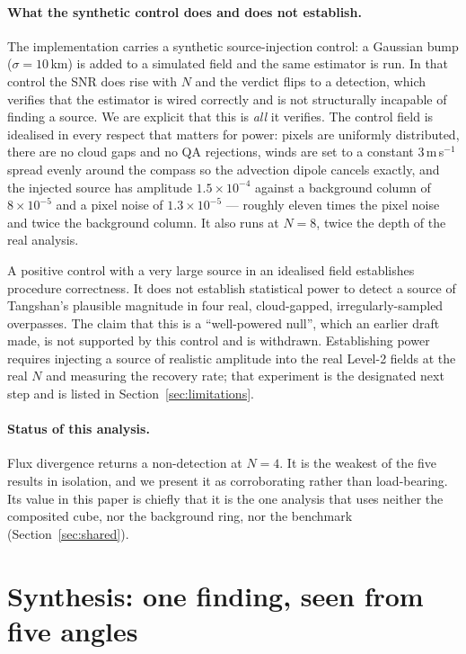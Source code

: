 \documentclass[11pt,a4paper]{article}
\begin{document}
\paragraph{What the synthetic control does and does not establish.} The implementation carries a
synthetic source-injection control: a Gaussian bump ($\sigma=10$\,km) is added to a simulated
field and the same estimator is run. In that control the SNR does rise with $N$ and the verdict
flips to a detection, which verifies that the estimator is wired correctly and is not
structurally incapable of finding a source. We are explicit that this is \emph{all} it verifies.
The control field is idealised in every respect that matters for power: pixels are uniformly
distributed, there are no cloud gaps and no QA rejections, winds are set to a constant
3\,m\,s$^{-1}$ spread evenly around the compass so the advection dipole cancels exactly, and the
injected source has amplitude $1.5\times10^{-4}$ against a background column of
$8\times10^{-5}$ and a pixel noise of $1.3\times10^{-5}$ --- roughly eleven times the pixel noise
and twice the background column. It also runs at $N{=}8$, twice the depth of the real analysis.

A positive control with a very large source in an idealised field establishes procedure
correctness. It does not establish statistical power to detect a source of Tangshan's plausible
magnitude in four real, cloud-gapped, irregularly-sampled overpasses. The claim that this is a
``well-powered null'', which an earlier draft made, is not supported by this control and is
withdrawn. Establishing power requires injecting a source of realistic amplitude into the real
Level-2 fields at the real $N$ and measuring the recovery rate; that experiment is the designated
next step and is listed in Section~\ref{sec:limitations}.

\paragraph{Status of this analysis.} Flux divergence returns a non-detection at $N{=}4$. It is the
weakest of the five results in isolation, and we present it as corroborating rather than
load-bearing. Its value in this paper is chiefly that it is the one analysis that uses neither the
composited cube, nor the background ring, nor the benchmark (Section~\ref{sec:shared}).

\section{Synthesis: one finding, seen from five angles}
\label{sec:synthesis}
\end{document}
